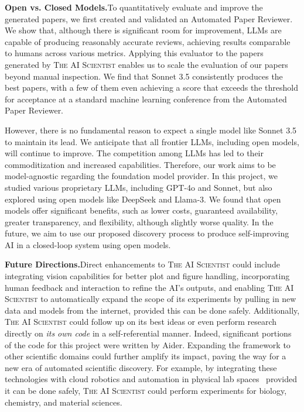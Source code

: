\documentclass[11pt, a4paper]{include/gdm_format}
\newcommand{\ouralgo}{\textsc{The AI Scientist}\xspace}
\begin{document}
\textbf{Open vs. Closed Models.}\;To quantitatively evaluate and improve the generated papers, we first created and validated an Automated Paper Reviewer. 
We show that, although there is significant room for improvement, LLMs are capable of producing reasonably accurate reviews, achieving results comparable to humans across various metrics.
Applying this evaluator to the papers generated by \ouralgo enables us to scale the evaluation of our papers beyond manual inspection.
We find that Sonnet 3.5 consistently produces the best papers, with a few of them even achieving a score that exceeds the threshold for acceptance at a standard machine learning conference from the Automated Paper Reviewer.

However, there is no fundamental reason to expect a single model like Sonnet 3.5 to maintain its lead.
We anticipate that all frontier LLMs, including open models, will continue to improve. 
The competition among LLMs has led to their commoditization and increased capabilities.
Therefore, our work aims to be model-agnostic regarding the foundation model provider.
In this project, we studied various proprietary LLMs, including GPT-4o and Sonnet, but also explored using open models like DeepSeek and Llama-3.
We found that open models offer significant benefits, such as lower costs, guaranteed availability, greater transparency, and flexibility, although slightly worse quality.
In the future, we aim to use our proposed discovery process to produce self-improving AI in a closed-loop system using open models.

\textbf{Future Directions.}\;Direct enhancements to \ouralgo could include integrating vision capabilities for better plot and figure handling, incorporating human feedback and interaction to refine the AI's outputs, and enabling \ouralgo to automatically expand the scope of its experiments by pulling in new data and models from the internet, provided this can be done safely. Additionally, \ouralgo could follow up on its best ideas or even perform research directly on \textit{its own code} in a self-referential manner. Indeed, significant portions of the code for this project were written by Aider. Expanding the framework to other scientific domains could further amplify its impact, paving the way for a new era of automated scientific discovery. For example, by integrating these technologies with cloud robotics and automation in physical lab spaces~\citep{kehoe2015survey, zucchelli2021highly, arnold2022cloud, sparkes2010towards} provided it can be done safely, \ouralgo could perform experiments for biology, chemistry, and material sciences.
\end{document}
